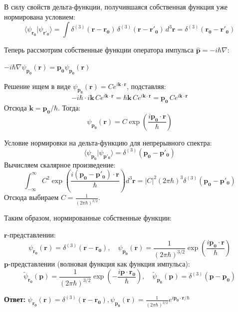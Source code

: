 \documentclass[a4paper, 12pt]{article}
\begin{document}
	\quad В силу свойств дельта-функции, получившаяся собственная функция уже нормирована условием:
	\[
	\langle \psi_{\mathbf{r_0}} | \psi_{\mathbf{r'_0}} \rangle = \int \delta^{(3)}(\mathbf{r} - \mathbf{r_0}) \, \delta^{(3)}(\mathbf{r} - \mathbf{r'_0}) \, d^3\mathbf{r} = \delta^{(3)}(\mathbf{r_0} - \mathbf{r'_0})
	\]
	
	\quad Теперь рассмотрим собственные функции оператора импульса $\hat{\mathbf{p}} = -i\hbar\nabla$:
	
	\begin{center}
		$-i\hbar\nabla \psi_{\mathbf{p_0}} (\mathbf{r}) = \mathbf{p_0} \psi_{\mathbf{p_0}} (\mathbf{r})$
		
		Решение ищем в виде $\psi_{\mathbf{p_0}} (\mathbf{r}) = C e^{i\mathbf{k}\cdot\mathbf{r}}$, подставляя:
		\[
		-i\hbar \cdot i\mathbf{k} \, C e^{i\mathbf{k}\cdot\mathbf{r}} = \hbar\mathbf{k} \, C e^{i\mathbf{k}\cdot\mathbf{r}} = \mathbf{p_0} \, C e^{i\mathbf{k}\cdot\mathbf{r}}
		\]
		Отсюда $\mathbf{k} = \mathbf{p_0}/\hbar$. Тогда:
		\[
		\psi_{\mathbf{p_0}} (\mathbf{r}) = C \exp\left( \frac{i\mathbf{p_0}\cdot\mathbf{r}}{\hbar} \right)
		\]
	\end{center}
	
	\quad Условие нормировки на дельта-функцию для непрерывного спектра:
	\[
	\langle \psi_{\mathbf{p_0}} | \psi_{\mathbf{p'_0}} \rangle = \delta^{(3)}(\mathbf{p_0} - \mathbf{p'_0})
	\]
	Вычисляем скалярное произведение:
	\[
	\int_{-\infty}^{\infty} C^2 \exp\left( \frac{i(\mathbf{p_0} - \mathbf{p'_0})\cdot\mathbf{r}}{\hbar} \right) d^3\mathbf{r} = |C|^2 (2\pi\hbar)^3 \delta^{(3)}(\mathbf{p_0} - \mathbf{p'_0})
	\]
	Отсюда выбираем $C = \frac{1}{(2\pi\hbar)^{3/2}}$.
	
	\quad Таким образом, нормированные собственные функции:
	
	$\mathbf{r}$-представлении:
		\[
		\psi_{\mathbf{r_0}}(\mathbf{r}) = \delta^{(3)}(\mathbf{r} - \mathbf{r_0}), \quad \psi_{\mathbf{p_0}}(\mathbf{r}) = \frac{1}{(2\pi\hbar)^{3/2}} \exp\left( \frac{i\mathbf{p_0}\cdot\mathbf{r}}{\hbar} \right)
		\]
	$\mathbf{p}$-представлении (волновая функция как функция импульса):
		\[
		\tilde{\psi}_{\mathbf{r_0}}(\mathbf{p}) = \frac{1}{(2\pi\hbar)^{3/2}} \exp\left( -\frac{i\mathbf{p}\cdot\mathbf{r_0}}{\hbar} \right), \quad \tilde{\psi}_{\mathbf{p_0}}(\mathbf{p}) = \delta^{(3)}(\mathbf{p} - \mathbf{p_0})
		\]
	
	\quad \textbf{Ответ:} 
	$\psi_{\mathbf{r_0}}(\mathbf{r}) = \delta^{(3)}(\mathbf{r} - \mathbf{r_0}), \psi_{\mathbf{p_0}}(\mathbf{r}) = \frac{1}{(2\pi\hbar)^{3/2}} e^{i\mathbf{p_0}\cdot\mathbf{r}/\hbar} $
	
\end{document}
